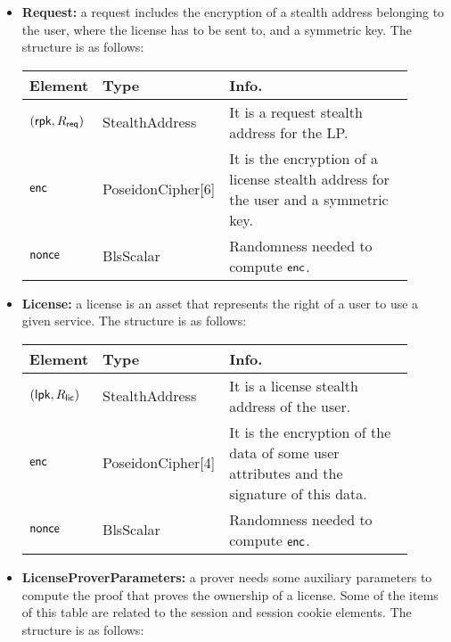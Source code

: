 \begin{itemize}
    \item \textbf{Request:} a request includes the encryption of a stealth address belonging to the user, where the license has to be sent to, and a symmetric key. The structure is as follows:

    \begin{center}
        \begin{tabular}{ | p{0.15\linewidth} | p{0.2\linewidth} | p{0.55\linewidth} | } 
        \hline
        \textbf{Element} & \textbf{Type} & \textbf{Info.} \\
        \hline
        $(\mathsf{rpk}, R_{\mathsf{req}})$ & StealthAddress & It is a request stealth address for the LP. \\
        $\mathsf{enc}$ & PoseidonCipher[6] & It is the encryption of a license stealth address for the user and a symmetric key. \\
        $\mathsf{nonce}$ & BlsScalar & Randomness needed to compute $\mathsf{enc}$. \\ 
        \hline
        \end{tabular}
    \end{center}

    \item \textbf{License:} a license is an asset that represents the right of a user to use a given service. The structure is as follows:

    \begin{center}
        \begin{tabular}{ | p{0.15\linewidth} | p{0.2\linewidth} | p{0.55\linewidth} | } 
        \hline
        \textbf{Element} & \textbf{Type} & \textbf{Info.} \\
        \hline
        $(\mathsf{lpk}, R_{\mathsf{lic}})$ & StealthAddress & It is a license stealth address of the user. \\
        $\mathsf{enc}$ & PoseidonCipher[4] & It is the encryption of the data of some user attributes and the signature of this data. \\
        $\mathsf{nonce}$ & BlsScalar & Randomness needed to compute $\mathsf{enc}$. \\ 
        \hline
        \end{tabular}
    \end{center}

    \item \textbf{LicenseProverParameters:} a prover needs some auxiliary parameters to compute the proof that proves the ownership of a license. Some of the items of this table are related to the session and session cookie elements. The structure is as follows:


\end{itemize}
